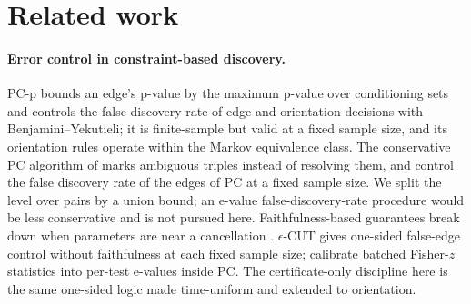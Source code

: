 
\section{Related work}\label{sec:related}

\paragraph{Error control in constraint-based discovery.} PC-p
\citep{strobl2019estimating} bounds an edge's p-value by the maximum p-value
over conditioning sets and controls the false discovery rate of edge and
orientation decisions with Benjamini--Yekutieli; it is finite-sample but
valid at a fixed sample size, and its orientation rules operate within the
Markov equivalence class. The conservative PC algorithm of
\citet{ramsey2006adjacency} marks ambiguous triples instead of resolving them, and
\citet{li2009controlling} control the false discovery rate of the edges of PC at a fixed
sample size. We split the level over pairs by a union bound; an e-value
false-discovery-rate procedure \citep{wang2022false} would be less conservative and is
not pursued here.
Faithfulness-based guarantees break down when parameters are near a
cancellation \citep{robins2003uniform,uhler2013geometry,zhang2008detection}.
$\epsilon$-CUT \citep{shaska2025causal} gives one-sided false-edge control
without faithfulness at each fixed sample size; \citet{csillag2025prediction}
calibrate batched Fisher-$z$ statistics into per-test e-values inside PC.
The certificate-only discipline here is the same one-sided logic made
time-uniform and extended to orientation.

